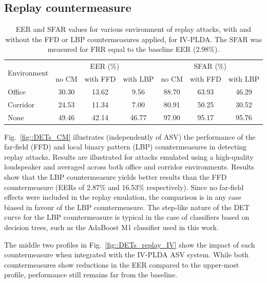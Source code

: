 \subsection{Replay countermeasure}


\begin{table}
\renewcommand{\arraystretch}{1.2}
\begin{center}
    \begin{tabular}{ l || c c c | c c c}
    \hline
 \multirow{2}{*}{Environment}  & \multicolumn{3}{c|}{EER (\%)} & \multicolumn{3}{c}{SFAR (\%)} \\
     	 & no CM & with FFD & with LBP & no CM & with FFD & with LBP\\ 

 \hline \hline
Office   & 30.30 & 13.62 & 9.56 & 88.70 & 63.93 & 46.29\\
Corridor & 24.53 & 11.34 & 7.00 & 80.91 & 50.25 & 30.52\\
None & 49.46 & 42.14 & 46.77 & 97.00 & 95.17 & 95.76\\
\hline
    \end{tabular}
    \caption{EER and SFAR values for various environment of replay attacks, with and without the FFD or LBP countermeasures applied, for IV-PLDA. The SFAR was measured for FRR equal to the baseline EER (2.98\%).}
		\label{tab::results_CM_rooms}
   \end{center}
\end{table}




Fig.~\ref{fig::DETs_CM} illustrates (independently of ASV) the performance of the far-field (FFD) and local binary pattern (LBP) countermeasures in detecting replay attacks.  Results are illustrated for attacks emulated using a high-quality loudspeaker and averaged across both office and corridor environments.  
Results show that the LBP countermeasure yields better results than the FFD countermeasure (EERs of 2.87\% and 16.53\% respectively).  Since no far-field effects were included in the replay emulation, the comparison is in any case biased in favour of the LBP countermeasure.  The step-like nature of the DET curve for the LBP countermeasure is typical in the case of classifiers based on decision trees, such as the AdaBoost M1 classifier used in this work.


The middle two profiles in Fig.~\ref{fig::DETs_replay_IV} show the impact of each countermeasure when integrated with the IV-PLDA ASV system.  %
While both countermeasures show reductions in the EER compared to the upper-most profile, performance still remains far from the baseline.


